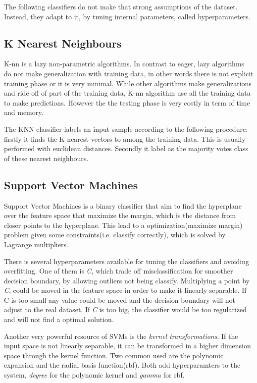 The following classifiers do not make that strong assumptions of the dataset. Instead, they adapt to it, by tuning internal parameters, called hyperparameters. 

\subsection*{K Nearest Neighbours}

K-nn is a lazy non-parametric algorithms. In contrast to eager, lazy algorithms do not make generalization with training data, in other words there is not explicit training phase or it is very minimal. While other algorithms make generalizations and ride off of part of the training data, K-nn algorithm use all the training data to make predictions. However the the testing phase is very costly in term of time and memory. 

The KNN classifier labels an input sample  according to the following procedure: firstly it finds the K nearest vectors to  among the training data. This is usually performed with euclidean distances. Secondly it label  as the majority votes class of these nearest neighbours. 

\subsection*{Support Vector Machines}

Support Vector Machines is a binary classifier that aim to find the hyperplane over the feature space that maximize the margin, which is the distance from closer points to the hyperplane. This lead to a optimization(maximize margin) problem given some constraints(i.e. classify correctly), which is solved by Lagrange multipliers. 

There is several hyperparameters available for tuning the classifiers and avoiding overfitting. One of them is \textit{C}, which trade off misclassification for smoother decision boundary, by allowing outliers not being classify. Multiplying a point by \textit{C}, could be moved in the feature space in order to make it linearly separable. If C is too small any value could be moved and the decision boundary will not adjust to the real dataset. If \textit{C} is too big, the classifier would be too regularized and will not find a optimal solution. 

Another very powerful resource of SVMs is the \textit{kernel transformations}. If the input space is not linearly separable, it can be transformed in a higher dimension space through the kernel function. Two common used are the polynomic expansion and the radial basis function(rbf). Both add hyperparamters to the system, \textit{degree} for the polynomic kernel and \textit{gamma} for rbf.

